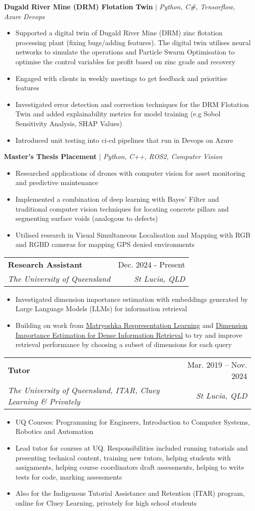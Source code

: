 \documentclass[letterpaper,11pt]{article}
\makeatletter
\newcommand{\resumeItem}[1]{
  \item\small{
    {#1 \vspace{-2pt}}
  }
}
\newcommand{\resumeSubheading}[4]{
  \vspace{-2pt}\item
  \begin{tabular*}{0.97\textwidth}[t]{l@{\extracolsep{\fill}}r}
    \textbf{#1} & #2 \\
    \textit{\small#3} & \textit{\small #4} \\
  \end{tabular*}\vspace{-7pt}
}
\newcommand{\resumeItemListStart}{\begin{itemize}}
\newcommand{\resumeItemListEnd}{\end{itemize}\vspace{-5pt}}
\makeatother
\begin{document}
\vspace{1em}
{\small\textbf{Dugald River Mine (DRM) Flotation Twin} $|$ \emph{Python, C\#, Tensorflow, Azure Devops}}
\vspace{-1em}

\resumeItemListStart
\resumeItem{Supported a digital twin of Dugald River Mine (DRM) zinc flotation processing
  plant (fixing bugs/adding features). The digital twin utilises neural networks
  to simulate the operations and Particle Swarm Optimisation to optimise the
  control variables for profit based on zinc grade and recovery}
\resumeItem{Engaged with clients in weekly meetings to get feedback and prioritise features}
\resumeItem{Investigated error detection and correction techniques for the DRM Flotation
  Twin and added explainability metrics for model training (e.g Sobol Sensitivity
  Analysis, SHAP Values)}
\resumeItem{Introduced unit testing into ci-cd pipelines that run in Devops on Azure}
\resumeItemListEnd

{\small\textbf{Master's Thesis Placement} $|$ \emph{Python, C++, ROS2, Computer Vision}}
\vspace{-1em}

\resumeItemListStart
\resumeItem{Researched applications of drones with computer vision for asset monitoring and
  predictive maintenance}
\resumeItem{Implemented a combination of deep learning with Bayes' Filter and traditional
  computer vision techniques for locating concrete pillars and segmenting surface
  voids (analogous to defects)}
\resumeItem{Utilised research in Visual Simultaneous Localisation and Mapping with RGB and
  RGBD cameras for mapping GPS denied environments}
\resumeItemListEnd

\resumeSubheading
{Research Assistant}{Dec. 2024 - Present}
{The University of Queensland}{St Lucia, QLD}
\resumeItemListStart
\resumeItem{Investigated dimension importance estimation with embeddings generated by Large
  Language Models (LLMs) for information retrieval}
\resumeItem{\sloppy Building on work from \href{https://doi.org/10.48550/arXiv.2205.13147}{\ul{Matryoshka Respresentation Learning}} and \href{https://doi.org/10.1145/3626772.3657691}{\ul{Dimension Importance Estimation for Dense Information Retrieval}}
  to try and improve retrieval performance by choosing a subset of dimensions for
  each query}
\resumeItemListEnd

\resumeSubheading
{Tutor}{Mar. 2019 -- Nov. 2024}
{The University of Queensland, ITAR, Cluey Learning \& Privately}{St Lucia, QLD}
\resumeItemListStart
\resumeItem{UQ Courses: Programming for Engineers, Introduction to Computer Systems, Robotics and Automation}
\resumeItem{Lead tutor for courses at UQ. Responsibilities included running tutorials and
  presenting technical content, training new tutors, helping students with assignments,
  helping course coordinators draft assessments, helping to write tests for code, marking assessments}
\resumeItem{Also for the Indigenous Tutorial Assistance and Retention (ITAR)
  program, online for Cluey Learning, privately for high school students}
\resumeItemListEnd
\end{document}
